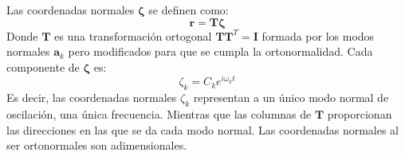 Las coordenadas normales $\mathbf{\zeta}$ se definen como:
\begin{equation}
\mathbf{r}=\mathbf{T}\mathbf{\zeta}
\end{equation}
Donde $\mathbf{T}$ es una transformaci\'{o}n ortogonal  $\mathbf{T}\mathbf{T}^T=\mathbf{I}$ formada por los modos normales $\mathbf{a}_k$  pero modificados para que se cumpla la ortonormalidad. Cada componente de $\mathbf{\zeta}$ es:
\begin{equation}\label{eq:nor}
\zeta_k=C_k e^{i\omega_k t}
\end{equation}
Es decir, las coordenadas normales $\zeta_k$ representan a un \'{u}nico modo normal de oscilaci\'{o}n, una \'{u}nica frecuencia. Mientras que las columnas de $\mathbf{T}$ proporcionan las direcciones en las que se da cada modo normal. Las coordenadas normales al ser ortonormales son adimensionales.\\


